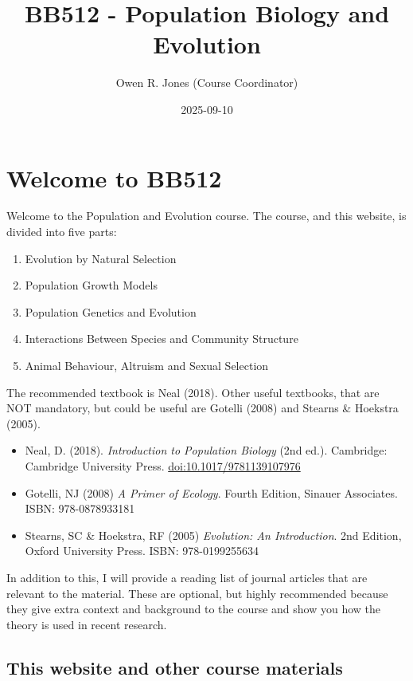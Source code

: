 \documentclass[
  a4paper]{book}
\title{BB512 - Population Biology and Evolution}
\author{Owen R. Jones (Course Coordinator)}
\date{2025-09-10}
\providecommand{\tightlist}{%
  \setlength{\itemsep}{0pt}\setlength{\parskip}{0pt}}
\begin{document}
\maketitle

{
\setcounter{tocdepth}{1}
\tableofcontents
}
\chapter{Welcome to BB512}\label{welcome-to-bb512}

Welcome to the Population and Evolution course.
The course, and this website, is divided into five parts:

\begin{enumerate}
\def\labelenumi{\arabic{enumi}.}
\tightlist
\item
  Evolution by Natural Selection
\item
  Population Growth Models
\item
  Population Genetics and Evolution
\item
  Interactions Between Species and Community Structure
\item
  Animal Behaviour, Altruism and Sexual Selection
\end{enumerate}

The recommended textbook is Neal (2018). Other useful textbooks, that are NOT mandatory, but could be useful are Gotelli (2008) and Stearns \& Hoekstra (2005).

\begin{itemize}
\tightlist
\item
  Neal, D. (2018). \emph{Introduction to Population Biology} (2nd ed.). Cambridge: Cambridge University Press. \url{doi:10.1017/9781139107976}
\item
  Gotelli, NJ (2008) \emph{A Primer of Ecology}. Fourth Edition, Sinauer Associates. ISBN: 978-0878933181
\item
  Stearns, SC \& Hoekstra, RF (2005) \emph{Evolution: An Introduction}. 2nd Edition, Oxford University Press. ISBN: 978-0199255634
\end{itemize}

In addition to this, I will provide a reading list of journal articles that are relevant to the material. These are optional, but highly recommended because they give extra context and background to the course and show you how the theory is used in recent research.

\section{This website and other course materials}\label{this-website-and-other-course-materials}
\end{document}
